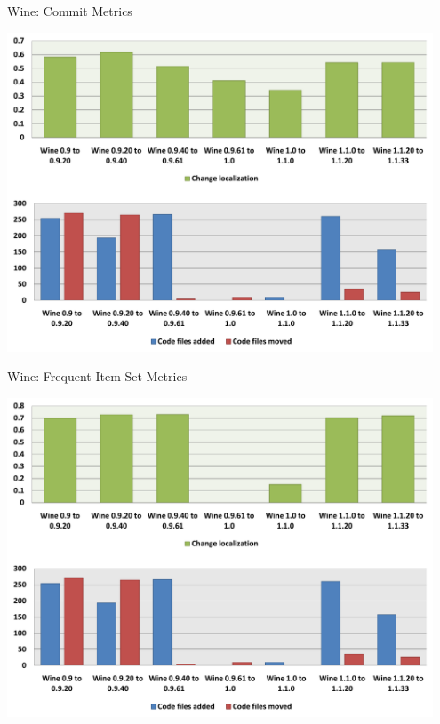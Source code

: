 
\begin{frame}{Wine: Commit Metrics}

  \begin{center}
    \includegraphics[width=0.95\textwidth]{minings/wine-commit-metrics}
  \end{center}

\end{frame}


\begin{frame}{Wine: Frequent Item Set Metrics}

  \begin{center}
    \includegraphics[width=0.95\textwidth]{minings/wine-fis-metrics}
  \end{center}

\end{frame}

